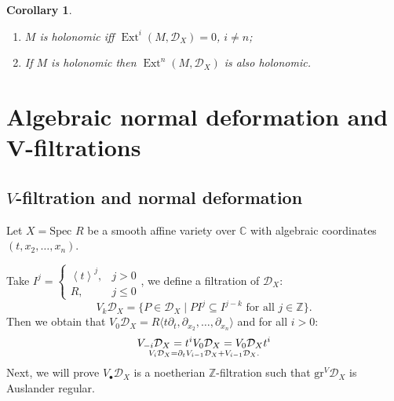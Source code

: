 \documentclass[openany]{book}
\newtheorem{corollary}[theorem]{Corollary}   %
\theoremstyle{definition} %
\theoremstyle{remark}
\begin{document}
\begin{corollary}
    \quad
    \begin{enumerate}
        \item $M$ is holonomic iff $\operatorname{Ext}^i(M, \mathcal{D}_X) = 0$, $i \neq n$;
        \item If $M$ is holonomic then $\operatorname{Ext}^n(M, \mathcal{D}_X)$ is also holonomic.
    \end{enumerate}
\end{corollary}



\chapter{Algebraic normal deformation and V-filtrations}

\section{$V$-filtration and normal deformation}
Let $X = \text{Spec } R$ be a smooth affine variety over $\mathbb{C}$ with algebraic coordinates $(t, x_2, \ldots, x_n)$.

Take $I^j =\begin{cases}\left< t \right>^{j},& j > 0\\R,&j\leq0\end{cases}$, we define a filtration of $\mathcal{D}_{X}$: $$V_{k} \mathcal{D}_X = \{P \in \mathcal{D}_X \mid P I^{j} \subseteq I^{j-k}\text{ for all }j\in \mathbb{Z}\}.$$Then we obtain that $V_0 \mathcal{D}_X = R \langle t\partial_t, \partial_{x_2}, \ldots, \partial_{x_n} \rangle$ and for all $i>0$: $$V_{-i} \mathcal{D}_{X} = t^{i} V_{0 }\mathcal{D}_{X }= V_{0} \mathcal{D}_{X} t^{i}\atop V_i \mathcal{D}_X = \partial_t V_{i-1} \mathcal{D}_X + V_{i-1} \mathcal{D}_X.$$Next, we will prove $V_{\bullet} \mathcal{D}_X$ is a noetherian $\mathbb{Z}$-filtration such that $\mathrm{gr}^V \mathcal{D}_X$ is Auslander regular.
\end{document}
